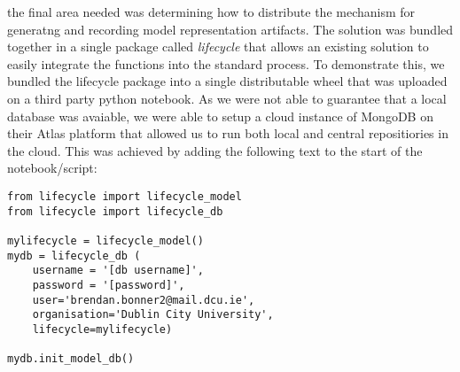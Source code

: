 the final area needed was determining how to distribute the mechanism for generatng and recording model representation artifacts. The solution was bundled together in a single package called \textit{lifecycle} that allows an existing solution to easily integrate the functions into the standard process. To demonstrate this, we bundled the lifecycle package into a single distributable wheel that was uploaded on a third party python notebook. As we were not able to guarantee that a local database was avaiable, we were able to setup a cloud instance of MongoDB on their Atlas platform that allowed us to run both local and central repositiories in the cloud. This was achieved by adding the following text to the start of the notebook/script:

\begin{lstlisting}[frame=single,basicstyle=\ttfamily]
from lifecycle import lifecycle_model
from lifecycle import lifecycle_db

mylifecycle = lifecycle_model()
mydb = lifecycle_db (
    username = '[db username]',
    password = '[password]',
    user='brendan.bonner2@mail.dcu.ie',
    organisation='Dublin City University',
    lifecycle=mylifecycle)

mydb.init_model_db()
\end{lstlisting}

